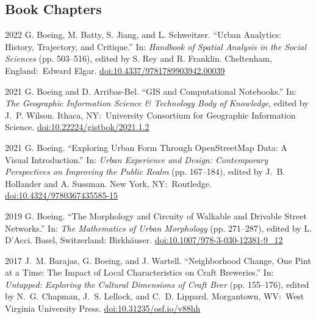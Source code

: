\documentclass[11pt,letterpaper]{report}
\begin{document}
    \subsection*{Book Chapters}

    \begin{tablist}

        \item[2022] \tab{}G. Boeing, M. Batty, S. Jiang, and L. Schweitzer. \enquote{Urban Analytics: History, Trajectory, and Critique.} In: \textit{Handbook of Spatial Analysis in the Social Sciences} (pp. 503--516), edited by S. Rey and R. Franklin. Cheltenham, England:\ Edward Elgar. \href{https://doi.org/10.4337/9781789903942.00039}{doi:10.4337/9781789903942.00039}

        \item[2021] \tab{}G. Boeing and D. Arribas-Bel. \enquote{GIS and Computational Notebooks.} In: \textit{The Geographic Information Science \& Technology Body of Knowledge}, edited by J.~P. Wilson. Ithaca, NY:\ University Consortium for Geographic Information Science. \href{https://doi.org/10.22224/gistbok/2021.1.2}{doi:10.22224/gistbok/2021.1.2}

        \item[2021] \tab{}G. Boeing. \enquote{Exploring Urban Form Through OpenStreetMap Data: A Visual Introduction.} In: \textit{Urban Experience and Design: Contemporary Perspectives on Improving the Public Realm} (pp. 167--184), edited by J.~B. Hollander and A. Sussman. New York, NY:\ Routledge. \href{https://doi.org/10.4324/9780367435585-15}{doi:10.4324/9780367435585-15}

        \item[2019] \tab{}G. Boeing. \enquote{The Morphology and Circuity of Walkable and Drivable Street Networks.} In: \textit{The Mathematics of Urban Morphology} (pp. 271--287), edited by L. D'Acci. Basel, Switzerland: Birkh{\"a}user. \href{https://doi.org/10.1007/978-3-030-12381-9_12}{doi:10.1007/978-3-030-12381-9\_12}

        \item[2017] \tab{}J.~M. Barajas, G. Boeing, and J. Wartell. \enquote{Neighborhood Change, One Pint at a Time: The Impact of Local Characteristics on Craft Breweries.} In: \textit{Untapped: Exploring the Cultural Dimensions of Craft Beer} (pp. 155--176), edited by N.~G. Chapman, J.~S. Lellock, and C.~D. Lippard. Morgantown, WV:\ West Virginia University Press. \href{https://doi.org/10.31235/osf.io/v88hh}{doi:10.31235/osf.io/v88hh}

    \end{tablist}
\end{document}

